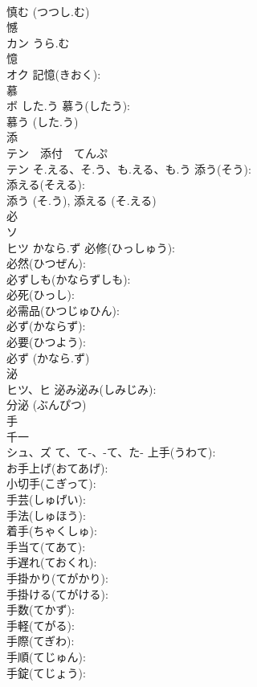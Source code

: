 \documentclass[8pt]{extreport}
\begin{document}
\begin{CJK}{UTF8}{min}
\\	慎む (つつし.む)
\\	憾			
\\	カン	うら.む		
\\	憶			
\\	オク		記憶(きおく): 
\\	慕			
\\	ボ	した.う	慕う(したう): 
\\	慕う (した.う)
\\	添			
\\	テン　添付　てんぷ
\\	テン	そ.える、そ.う、も.える、も.う	添う(そう): 
\\	添える(そえる): 
\\	添う (そ.う), 添える (そ.える)
\\	必			
\\	ソ 
\\	ヒツ	かなら.ず	必修(ひっしゅう): 
\\	必然(ひつぜん): 
\\	必ずしも(かならずしも): 
\\	必死(ひっし): 
\\	必需品(ひつじゅひん): 
\\	必ず(かならず): 
\\	必要(ひつよう): 
\\	必ず (かなら.ず)
\\	泌			
\\	ヒツ、ヒ		泌み泌み(しみじみ): 
\\	分泌 (ぶんぴつ)
\\	手			
\\	千一
\\	シュ、ズ	て、て-、-て、た-	上手(うわて): 
\\	お手上げ(おてあげ): 
\\	小切手(こぎって): 
\\	手芸(しゅげい): 
\\	手法(しゅほう): 
\\	着手(ちゃくしゅ): 
\\	手当て(てあて): 
\\	手遅れ(ておくれ): 
\\	手掛かり(てがかり): 
\\	手掛ける(てがける): 
\\	手数(てかず): 
\\	手軽(てがる): 
\\	手際(てぎわ): 
\\	手順(てじゅん): 
\\	手錠(てじょう): 

\end{CJK}
\end{document}
